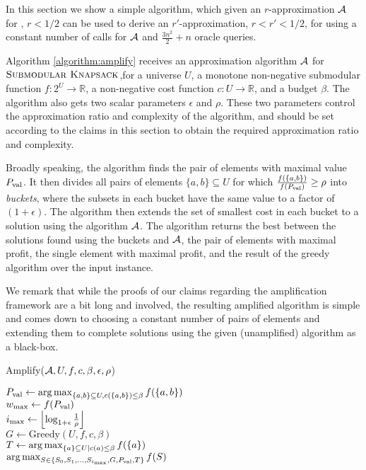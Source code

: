 \documentclass[a4paper]{article}
\begin{document}
In this section we show a simple algorithm, which given
an $r$-approximation $\mathcal{A}$ for \SK, $r<1/2$ can
be used to derive an $r'$-approximation, $r<r' <1/2$, for
\SK using  a constant number of calls
for $\mathcal{A}$ and $\frac{3n^2}{2}+n$ oracle queries.

Algorithm \ref{algorithm:amplify} receives
an approximation algorithm $\mathcal{A}$ for ${\textsc{Submodular Knapsack}}$,for
a universe $U$, a monotone non-negative
submodular function $f:2^U \rightarrow \mathbb{R}$,
a non-negative cost function $c:U \rightarrow \mathbb{R}$, and a budget $\beta$.
The algorithm also gets two scalar parameters $\epsilon$
and $\rho$.  These two parameters control the approximation
ratio and complexity of the algorithm, and should be set according
to the claims in this section to obtain the required approximation
ratio and complexity.

Broadly speaking,  the algorithm finds the pair of  elements with maximal value $P_{\text{val}}$. It then divides all pairs of elements $\{a,b\} \subseteq U$ for which
$\frac{f(\{a,b\})}{f(P_{\text{val}})} \geq \rho$ into {\em buckets}, where the subsets
in each bucket have the same value to a factor of $(1+\epsilon)$.
The algorithm then extends the set of smallest cost in  each bucket
to a solution using the algorithm $\mathcal{A}$.  The algorithm returns the
best between the solutions found using the buckets and $\mathcal{A}$, the pair of
elements with maximal profit, the single element with maximal profit, and the result of the greedy algorithm over the input instance.

We remark that while the proofs of our claims regarding the amplification framework are a bit long and involved, the resulting amplified algorithm is simple and comes down to choosing a constant number of pairs of elements and extending them to complete solutions using the given (unamplified) algorithm as a black-box.

\begin{algorithm}
	\caption{Amplify($\mathcal{A}, U, f, c, \beta, \epsilon, \rho$)}
	\label{algorithm:amplify}
	$P_{\text{val}} \leftarrow \operatorname*{arg\,max}_{ \{a,b\} \subseteq U, c(\{a,b\})\leq \beta } f(\{a,b\})$
	\\ $w_{\max}\leftarrow f(P_{\text{val}})$
	\\ $i_{\max} \leftarrow \left\lfloor \log_{1 + \epsilon} \frac{1}{\rho} \right\rfloor$
	\\
	$G \leftarrow \text{Greedy}(U, f, c, \beta)$ \label{amplify:greedy}
	\\
	$T \leftarrow \operatorname*{arg\,max}_{\{a\}\subseteq U| c(a)\leq \beta} f(\{a\})$ \label{amplify:singletons}
	\\
	\Return $\operatorname*{arg\,max}_{S \in \{S_0, S_1, \ldots, S_{i_{\max}}, G, P_{\text{val}},T\}} f(S)$

\end{algorithm}
\end{document}
